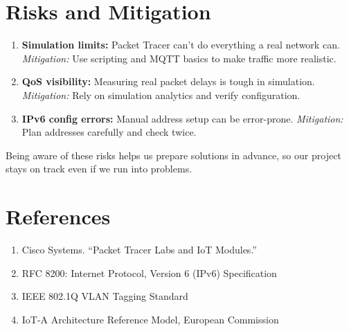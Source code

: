\documentclass[12pt,a4paper]{article}
\begin{document}
\section*{Risks and Mitigation}
\begin{enumerate}[label=8.\arabic*, nosep]
    \item \textbf{Simulation limits:} Packet Tracer can’t do everything a real network can.
    \textit{Mitigation:} Use scripting and MQTT basics to make traffic more realistic.
    \item \textbf{QoS visibility:} Measuring real packet delays is tough in simulation.
    \textit{Mitigation:} Rely on simulation analytics and verify configuration.
    \item \textbf{IPv6 config errors:} Manual address setup can be error-prone.
    \textit{Mitigation:} Plan addresses carefully and check twice.
\end{enumerate}
Being aware of these risks helps us prepare solutions in advance, so our project stays on track even if we run into problems.

\vspace{1em}

\section*{References}
\begin{enumerate}[label=9.\arabic*, nosep]
    \item Cisco Systems. ``Packet Tracer Labs and IoT Modules.''
    \item RFC 8200: Internet Protocol, Version 6 (IPv6) Specification
    \item IEEE 802.1Q VLAN Tagging Standard
    \item IoT-A Architecture Reference Model, European Commission
\end{enumerate}
\end{document}
